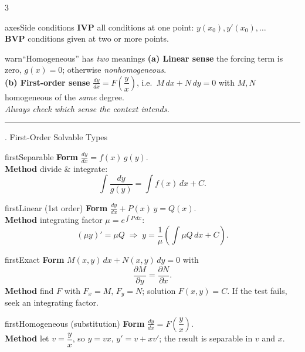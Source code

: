 \documentclass[10pt]{article}
\newcommand{\lab}[1]{\textcolor{ink}{\sffamily\footnotesize\textbf{#1}}\;}
\newcommand{\dydx}{\frac{dy}{dx}}
\newcommand{\sect}[2]{%
  \begin{tcolorbox}[blanker, breakable, before skip=2pt, after skip=2pt]
    \begingroup\sffamily\bfseries\normalsize\color{#1}%
    {\color{#1}\rule[-1pt]{3pt}{12pt}}\;#2\endgroup
    \par\vspace{1pt}{\color{#1}\hrule height 1pt}
\end{tcolorbox}}
\begin{document}
\begin{multicols}{3}
  \begin{card}{axes}{Side conditions}
    \lab{IVP} all conditions at one point: \(y(x_{0}),y'(x_{0}),\dots\)\\
    \lab{BVP} conditions given at two or more points.
  \end{card}

  \begin{card}{warn}{``Homogeneous'' has \emph{two} meanings}
    \lab{(a) Linear sense} the forcing term is zero, \(g(x)=0\); otherwise \emph{nonhomogeneous}.\\[2pt]
    \lab{(b) First-order sense} \(\dydx=F\!\left(\dfrac{y}{x}\right)\), i.e.\ \(M\,dx+N\,dy=0\) with \(M,N\) homogeneous of the \emph{same} degree.\\[2pt]
    \textit{Always check which sense the context intends.}
  \end{card}

  \columnbreak
  \sect{first}{2.\; First-Order Solvable Types}

  \begin{card}{first}{Separable}
    \lab{Form} \(\dydx=f(x)\,g(y)\).\\
    \lab{Method} divide \& integrate:
    \[ \int\frac{dy}{g(y)}=\int f(x)\,dx + C. \]
  \end{card}

  \begin{card}{first}{Linear (1st order)}
    \lab{Form} \(\dydx+P(x)\,y=Q(x)\).\\
    \lab{Method} integrating factor \(\mu=e^{\int P\,dx}\):
    \[ (\mu y)'=\mu Q \;\Rightarrow\; y=\frac{1}{\mu}\!\left(\int \mu Q\,dx + C\right). \]
  \end{card}

  \begin{card}{first}{Exact}
    \lab{Form} \(M(x,y)\,dx+N(x,y)\,dy=0\) with
    \[ \frac{\partial M}{\partial y}=\frac{\partial N}{\partial x}. \]
    \lab{Method} find \(F\) with \(F_{x}=M,\,F_{y}=N\); solution \(F(x,y)=C\). If the test fails, seek an integrating factor.
  \end{card}

  \begin{card}{first}{Homogeneous (substitution)}
    \lab{Form} \(\dydx=F\!\left(\dfrac{y}{x}\right)\).\\
    \lab{Method} let \(v=\dfrac{y}{x}\), so \(y=vx\), \(y'=v+xv'\); the result is separable in \(v\) and \(x\).
  \end{card}


\end{multicols}
\end{document}
